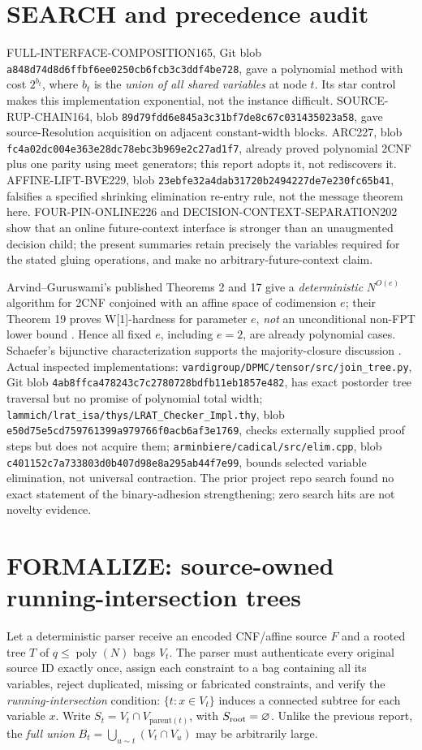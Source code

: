 \documentclass[11pt]{article}
\begin{document}
\section{SEARCH and precedence audit}
FULL-INTERFACE-COMPOSITION165, Git blob
\texttt{a848d74d8d6ffbf6ee0250cb6fcb3c3ddf4be728}, gave a polynomial
method with cost $2^{b_t}$, where $b_t$ is the \emph{union of all shared
variables} at node $t$. Its star control makes this implementation exponential,
not the instance difficult. SOURCE-RUP-CHAIN164, blob
\texttt{89d79fdd6e845a3c31bf7de8c67c031435023a58}, gave source-Resolution
acquisition on adjacent constant-width blocks. ARC227, blob
\texttt{fc4a02dc004e363e28dc78ebc3b969e2c27ad1f7}, already proved
polynomial 2CNF plus one parity using meet generators; this report adopts it,
not rediscovers it. AFFINE-LIFT-BVE229, blob
\texttt{23ebfe32a4dab31720b2494227de7e230fc65b41}, falsifies a
specified shrinking elimination re-entry rule, not the message theorem here.
FOUR-PIN-ONLINE226 and DECISION-CONTEXT-SEPARATION202 show that an online
future-context interface is stronger than an unaugmented decision child; the
present summaries retain precisely the variables required for the stated
gluing operations, and make no arbitrary-future-context claim.

Arvind--Guruswami's published Theorems 2 and 17 give a \emph{deterministic}
$N^{O(e)}$ algorithm for 2CNF conjoined with an affine space of codimension
$e$; their Theorem 19 proves W[1]-hardness for parameter $e$, \emph{not} an
unconditional non-FPT lower bound \cite{arvind2021}. Hence all fixed $e$,
including $e=2$, are already polynomial cases. Schaefer's bijunctive
characterization supports the majority-closure discussion \cite{schaefer1978}.
Actual inspected implementations: \texttt{vardigroup/DPMC/tensor/src/join\_tree.py},
Git blob \texttt{4ab8ffca478243c7c2780728bdfb11eb1857e482}, has exact
postorder tree traversal but no promise of polynomial total width;
\texttt{lammich/lrat\_isa/thys/LRAT\_Checker\_Impl.thy}, blob
\texttt{e50d75e5cd759761399a979766f0acb6af3e1769}, checks externally
supplied proof steps but does not acquire them;
\texttt{arminbiere/cadical/src/elim.cpp}, blob
\texttt{c401152c7a733803d0b407d98e8a295ab44f7e99}, bounds selected
variable elimination, not universal contraction. The prior project repo search
found no exact statement of the binary-adhesion strengthening; zero search
hits are not novelty evidence.

\section{FORMALIZE: source-owned running-intersection trees}
Let a deterministic parser receive an encoded CNF/affine source $F$ and a
rooted tree $T$ of $q\le\operatorname{poly}(N)$ bags $V_t$. The parser must
authenticate every original source ID exactly once, assign each constraint to
a bag containing all its variables, reject duplicated, missing or fabricated
constraints, and verify the \emph{running-intersection} condition:
$\{t:x\in V_t\}$ induces a connected subtree for each variable $x$.
Write $S_t=V_t\cap V_{\mathrm{parent}(t)}$, with $S_{\rm root}=\varnothing$.
Unlike the previous report, the \emph{full union}
$B_t=\bigcup_{u\sim t}(V_t\cap V_u)$ may be arbitrarily large.
\end{document}
